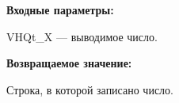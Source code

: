 \textbf{Входные параметры:}

VHQt\_X --- выводимое число.

\textbf{Возвращаемое значение:}

Строка, в которой записано число.